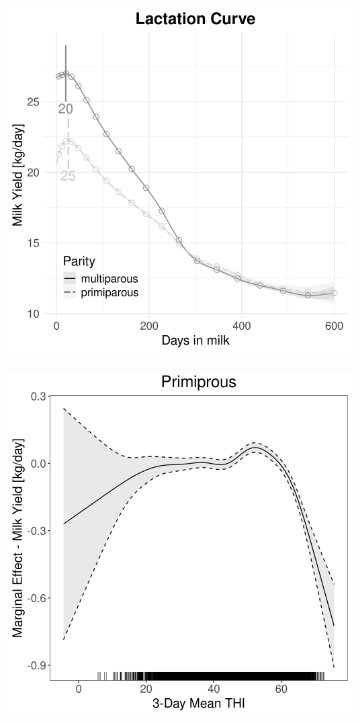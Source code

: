 \begin{figure}[H]
\begin{subfigure}[b]{0.45\textwidth}
        \includegraphics[width=\textwidth]{thesis/figures/models/milk/before2010/si_milk_before2010/si_milk_before2010_marginal_dim_milk_combined.png}
    \end{subfigure}
    \begin{subfigure}[b]{0.45\textwidth}
        \centering
        \includegraphics[width=\textwidth]{thesis/figures/models/milk/before2010/si_milk_before2010/si_milk_before2010_marginal_thi_milk_primi.png}

\end{subfigure}
\end{figure}
